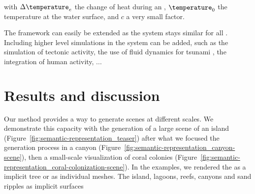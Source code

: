 with $\Delta \temperature_e$ the change of heat during an , $\temperature_0$ the temperature at the water surface, and $c$ a very small factor.

The framework can easily be extended as the  system stays similar for all . Including higher level simulations in the  system can be added, such as the simulation of tectonic activity, the use of fluid dynamics for tsunami , the integration of human activity, ...

\section{Results and discussion}
\label{sec:semantic-representation_results}
Our method provides a way to generate scenes at different scales. We demonstrate this capacity with the generation of a large scene of an island (Figure~\ref{fig:semantic-representation_teaser}) after what we focused the generation process in a canyon (Figure~\ref{fig:semantic-representation_canyon-scene}), then a small-scale visualization of coral colonies (Figure~\ref{fig:semantic-representation_coral-colonization-scene}).
In the examples, we rendered the  as a implicit tree or as individual meshes. The island, lagoons, reefs, canyons and sand ripples as implicit surfaces

